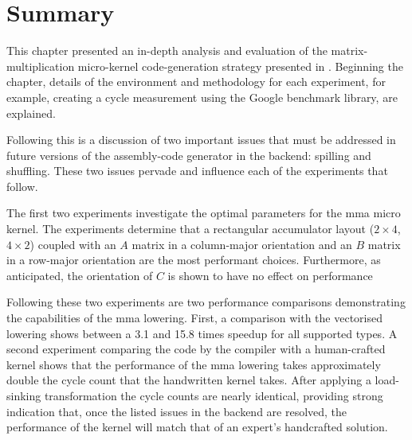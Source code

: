 \documentclass[\main/thesis.tex]{subfiles}
\begin{document}
\section{Summary}
This chapter presented an in-depth analysis and evaluation of the matrix-multiplication micro-kernel code-generation strategy presented in .
Beginning the chapter, details of the environment and methodology for each experiment, for example, creating a cycle measurement using the Google benchmark library, are explained.

Following this is a discussion of two important issues that must be addressed in future versions of the assembly-code generator in the backend: spilling and shuffling.
These two issues pervade and influence each of the experiments that follow.

The first two experiments investigate the optimal parameters for the \gls{mma} micro kernel.
The experiments determine that a rectangular accumulator layout ($2 \times 4$, $4 \times 2$) coupled with an $A$ matrix in a column-major orientation and an $B$ matrix in a row-major orientation are the most performant choices.
Furthermore, as anticipated, the orientation of $C$ is shown to have no effect on performance

Following these two experiments are two performance comparisons demonstrating the capabilities of the \gls{mma} \gls{lowering}.
First, a comparison with the vectorised \gls{lowering} shows between a 3.1 and 15.8 times speedup for all supported types.
A second experiment comparing the code  by the compiler with a human-crafted kernel shows that the performance of the \gls{mma} \gls{lowering} takes approximately double the cycle count that the handwritten kernel takes.
After applying a load-sinking transformation the cycle counts are nearly identical, providing strong indication that, once the listed issues in the backend are resolved, the performance of the kernel will match that of an expert's handcrafted solution.
\end{document}
